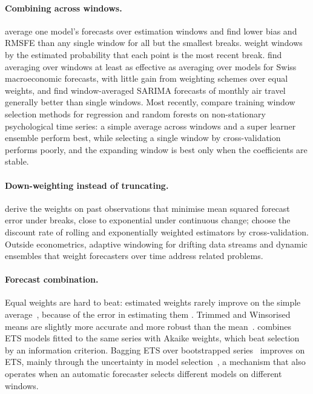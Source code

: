 \documentclass[11pt]{article}
\begin{document}
\paragraph{Combining across windows.}
\citet{pesaran11averaging} average one model's forecasts over estimation
windows and find lower bias and RMSFE than any single window for all but the
smallest breaks. \citet{tian14breaks} weight windows by the estimated
probability that each point is the most recent break.
\citet{assenmacher08swiss} find averaging over windows at least as effective as
averaging over models for Swiss macroeconomic forecasts, with little gain from
weighting schemes over equal weights, and \citet{jungmittag16air} find
window-averaged SARIMA forecasts of monthly air travel generally better than
single windows. Most recently, \citet{petersen26windows} compare training
window selection methods for regression and random forests on non-stationary
psychological time series: a simple average across windows and a super learner
ensemble perform best, while selecting a single window by cross-validation
performs poorly, and the expanding window is best only when the coefficients
are stable.

\paragraph{Down-weighting instead of truncating.}
\citet{pesaran13optimal} derive the weights on past observations that minimise
mean squared forecast error under breaks, close to exponential under
continuous change; \citet{giraitis13adaptive} choose the discount rate of
rolling and exponentially weighted estimators by cross-validation. Outside
econometrics, adaptive windowing for drifting data streams
\citep{bifet07adwin} and dynamic ensembles that weight forecasters over time
\citep{cerqueira17arbitrated} address related problems.

\paragraph{Forecast combination.}
Equal weights are hard to beat: estimated weights rarely improve on the simple
average~\citep{stock04combination}, because of the error in estimating them
\citep{smith09puzzle,claeskens16puzzle}. Trimmed and Winsorised means are
slightly more accurate and more robust than the mean~\citep{jose08robust}.
\citet{kolassa11akaike} combines ETS models fitted to the same series with
Akaike weights, which beat selection by an information criterion. Bagging ETS
over bootstrapped series~\citep{bergmeir16bagging} improves on ETS, mainly
through the uncertainty in model selection~\citep{petropoulos18bagging}, a
mechanism that also operates when an automatic forecaster selects different
models on different windows.
\end{document}
